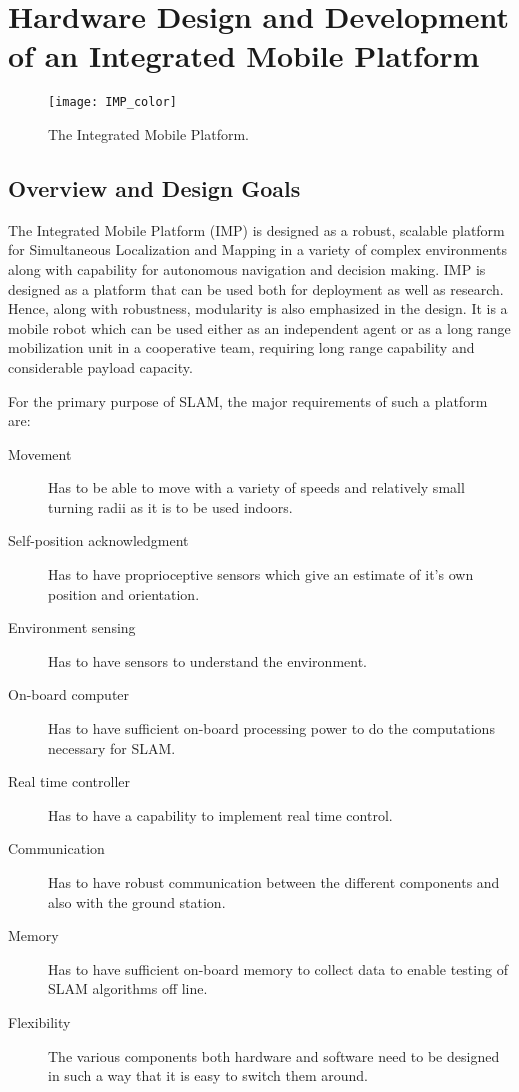 \chapter{Hardware Design and Development of an Integrated Mobile Platform}
\label{cha:Platform }


\begin{figure}
\centering
\texttt{[image: IMP\_color]}
\caption{The Integrated Mobile Platform.}
\label{fig:IMP_color}
\end{figure}
\section{Overview and Design Goals}

The Integrated Mobile Platform (IMP) is designed as a robust, scalable platform for Simultaneous Localization and Mapping in a variety of complex environments along with capability for autonomous navigation and decision making. IMP is designed as a platform that can be used both for deployment as well as research. Hence, along with robustness, modularity is also emphasized in the design. It is a mobile robot which can be used either as an independent agent or as a long range mobilization unit in a cooperative team, requiring long range capability and considerable payload capacity.

For the primary purpose of SLAM, the major requirements of such a platform are:
\begin{description}
	\item[Movement] Has to be able to move with a variety of speeds and relatively small turning radii as it is to be used indoors. 
	\item[Self-position acknowledgment] Has to have proprioceptive sensors which give an estimate of it's own position and orientation.
	\item[Environment sensing] Has to have sensors to understand the environment. 
	\item[On-board computer] Has to have sufficient on-board processing power to do the computations necessary for SLAM.
	\item[Real time controller] Has to have a capability to implement real time control.
	\item[Communication] Has to have robust communication between the different components and also with the ground station. 
	\item[Memory] Has to have sufficient on-board memory to collect data to enable testing of SLAM algorithms off line.  
	\item[Flexibility] The various components both hardware and software need to be designed in such a way that it is easy to switch them around.
\end{description}

